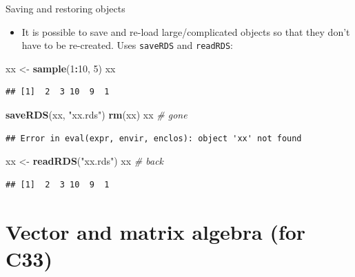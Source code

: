 \documentclass[
  ignorenonframetext,
]{beamer}
\newenvironment{Shaded}{\begin{snugshade}}{\end{snugshade}}
\newcommand{\CommentTok}[1]{\textcolor[rgb]{0.56,0.35,0.01}{\textit{#1}}}
\newcommand{\DecValTok}[1]{\textcolor[rgb]{0.00,0.00,0.81}{#1}}
\newcommand{\KeywordTok}[1]{\textcolor[rgb]{0.13,0.29,0.53}{\textbf{#1}}}
\newcommand{\NormalTok}[1]{#1}
\newcommand{\OperatorTok}[1]{\textcolor[rgb]{0.81,0.36,0.00}{\textbf{#1}}}
\newcommand{\StringTok}[1]{\textcolor[rgb]{0.31,0.60,0.02}{#1}}
\providecommand{\tightlist}{%
  \setlength{\itemsep}{0pt}\setlength{\parskip}{0pt}}
\begin{document}
\begin{frame}[fragile]{Saving and restoring objects}
\protect\hypertarget{saving-and-restoring-objects}{}

\begin{itemize}
\tightlist
\item
  It is possible to save and re-load large/complicated objects so that
  they don't have to be re-created. Uses \texttt{saveRDS} and
  \texttt{readRDS}:
\end{itemize}

\begin{Shaded}
\begin{Highlighting}[]
\NormalTok{xx <-}\StringTok{ }\KeywordTok{sample}\NormalTok{(}\DecValTok{1}\OperatorTok{:}\DecValTok{10}\NormalTok{, }\DecValTok{5}\NormalTok{)}
\NormalTok{xx}
\end{Highlighting}
\end{Shaded}

\begin{verbatim}
## [1]  2  3 10  9  1
\end{verbatim}

\begin{Shaded}
\begin{Highlighting}[]
\KeywordTok{saveRDS}\NormalTok{(xx, }\StringTok{"xx.rds"}\NormalTok{)}
\KeywordTok{rm}\NormalTok{(xx)}
\NormalTok{xx }\CommentTok{# gone}
\end{Highlighting}
\end{Shaded}

\begin{verbatim}
## Error in eval(expr, envir, enclos): object 'xx' not found
\end{verbatim}

\begin{Shaded}
\begin{Highlighting}[]
\NormalTok{xx <-}\StringTok{ }\KeywordTok{readRDS}\NormalTok{(}\StringTok{"xx.rds"}\NormalTok{)}
\NormalTok{xx }\CommentTok{# back}
\end{Highlighting}
\end{Shaded}

\begin{verbatim}
## [1]  2  3 10  9  1
\end{verbatim}

\end{frame}

\hypertarget{vector-and-matrix-algebra-for-c33}{%
\section{Vector and matrix algebra (for
C33)}\label{vector-and-matrix-algebra-for-c33}}
\end{document}

